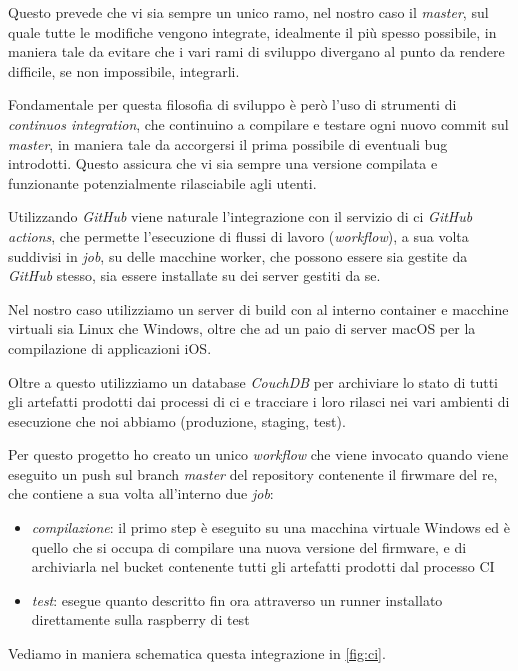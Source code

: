 \documentclass[12pt,a4paper,twoside,titlepage]{book}
\begin{document}
Questo prevede che vi sia sempre un unico ramo, nel nostro caso il \textit{master}, sul 
quale tutte le modifiche vengono integrate, idealmente il più spesso possibile, in 
maniera tale da evitare che i vari rami di sviluppo divergano al punto da rendere difficile,
se non impossibile, integrarli.

Fondamentale per questa filosofia di sviluppo è però l'uso di strumenti di \textit{continuos integration},
che continuino a compilare e testare ogni nuovo commit sul \textit{master}, in maniera 
tale da accorgersi il prima possibile di eventuali bug introdotti. Questo assicura che 
vi sia sempre una versione compilata e funzionante potenzialmente rilasciabile agli utenti. 

Utilizzando \textit{GitHub} viene naturale l'integrazione con il servizio di \acrshort{ci} 
\textit{GitHub actions}, che permette l'esecuzione di flussi di lavoro (\textit{workflow}), 
a sua volta suddivisi in \textit{job}, su delle macchine worker, che possono essere sia 
gestite da \textit{GitHub} stesso, sia essere installate su dei server gestiti da se. 

Nel nostro caso utilizziamo un server di build con al interno container e macchine virtuali 
sia Linux che Windows, oltre che ad un paio di server macOS per la compilazione di applicazioni 
iOS. 

Oltre a questo utilizziamo un database \textit{CouchDB} per archiviare lo stato di tutti 
gli artefatti prodotti dai processi di \acrshort{ci} e tracciare i loro rilasci nei vari ambienti di 
esecuzione che noi abbiamo (produzione, staging, test). 

Per questo progetto ho creato un unico \textit{workflow} che viene invocato quando viene eseguito 
un push sul branch \textit{master} del repository contenente il firwmare del \Gls{re}, 
che contiene a sua volta all'interno due \textit{job}:
\begin{itemize}
    \item \textit{compilazione}: il primo step è eseguito su una macchina virtuale Windows 
        ed è quello che si occupa di compilare una nuova versione del \gls{firmware}, e di archiviarla
        nel bucket contenente tutti gli artefatti prodotti dal processo CI
    \item \textit{test}: esegue quanto descritto fin ora attraverso un runner installato 
        direttamente sulla raspberry di test 
\end{itemize}

Vediamo in maniera schematica questa integrazione in \autoref{fig:ci}. 
\end{document}
